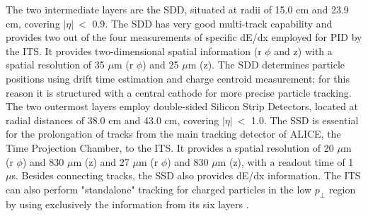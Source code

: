 \documentclass[12pt,a4paper]{book}
\begin{document}
The two intermediate layers are the SDD, situated at radii of 15.0 cm and 23.9 cm, covering $|\eta|\ <$ 0.9. The SDD has very good multi-track capability and provides two out of the four measurements of specific dE/dx employed for PID by the ITS. It provides two-dimensional spatial information (r $\phi$ and z) with a spatial resolution of 35 $\mu$m (r $\phi$) and 25 $\mu$m (z). The SDD determines particle positions using drift time estimation and charge centroid measurement; for this reason it is structured with a central cathode for more precise particle tracking.
The two outermost layers employ double-sided Silicon Strip Detectors, located at radial distances of 38.0 cm and 43.0 cm, covering $|\eta|\ <$ 1.0. The SSD is essential for the prolongation of tracks from the main tracking detector of ALICE, the Time Projection Chamber, to the ITS. It provides a spatial resolution of 20 $\mu$m (r $\phi$) and 830 $\mu$m (z) and 27 $\mu$m (r $\phi$) and 830 $\mu$m (z), with a readout time of 1 $\mu$s. Besides connecting tracks, the SSD also provides dE/dx information. The ITS can also perform "standalone" tracking for charged particles in the low $p_\perp$ region by using exclusively the information from its six layers 
	\cite{Padhan:2924203} \cite{amsdottorato9036} \cite{Cheng:2908766} \cite{Arata:2922803}.
	
\end{document}
